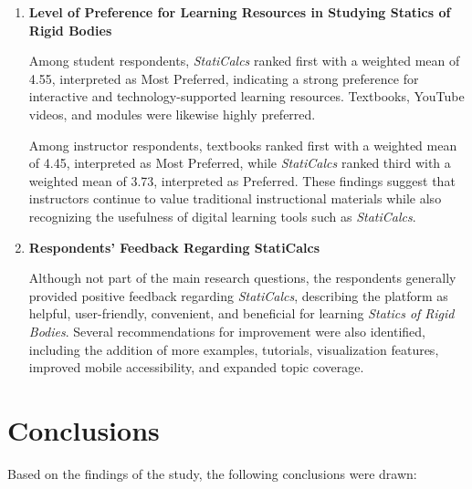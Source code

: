 \begin{enumerate}
    \item \textbf{Level of Preference for Learning Resources in Studying Statics of Rigid Bodies}

    Among student respondents, \textit{StatiCalcs} ranked first with a weighted mean of 4.55, interpreted as Most Preferred, indicating a strong preference for interactive and technology-supported learning resources. Textbooks, YouTube videos, and modules were likewise highly preferred.

    Among instructor respondents, textbooks ranked first with a weighted mean of 4.45, interpreted as Most Preferred, while \textit{StatiCalcs} ranked third with a weighted mean of 3.73, interpreted as Preferred. These findings suggest that instructors continue to value traditional instructional materials while also recognizing the usefulness of digital learning tools such as \textit{StatiCalcs}.

    \item \textbf{Respondents' Feedback Regarding StatiCalcs}

    Although not part of the main research questions, the respondents generally provided positive feedback regarding \textit{StatiCalcs}, describing the platform as helpful, user-friendly, convenient, and beneficial for learning \textit{Statics of Rigid Bodies}. Several recommendations for improvement were also identified, including the addition of more examples, tutorials, visualization features, improved mobile accessibility, and expanded topic coverage.    

\end{enumerate}


\section{Conclusions}\label{sec:5-conclusions}

Based on the findings of the study, the following conclusions were drawn:


